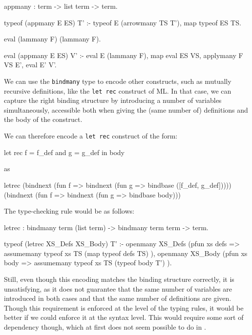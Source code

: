 \documentclass[format=acmlarge,review,anonymous]{acmart}\settopmatter{printfolios=true}
\begin{document}
\begin{codequote}
appmany : term -> list term -> term.

typeof (appmany E ES) T' :-
  typeof E (arrowmany TS T'),
  map typeof ES TS.

eval (lammany F) (lammany F).

eval (appmany E ES) V' :-
  eval E (lammany F),
  map eval ES VS,
  applymany F VS E',
  eval E' V'.
\end{codequote}

We can use the \texttt{bindmany} type to encode other constructs, such
as mutually recursive definitions, like the \texttt{let rec} construct
of ML. In that case, we can capture the right binding structure by
introducing a number of variables simultaneously, accessible both when
giving the (same number of) definitions and the body of the construct.

We can therefore encode a \texttt{let rec} construct of the form:

\begin{codequote}
let rec f = f_def and g = g_def in body
\end{codequote}

as

\begin{codequote}
letrec (bindnext (fun f => bindnext (fun g => bindbase ([f_def, g_def]))))
       (bindnext (fun f => bindnext (fun g => bindbase body)))
\end{codequote}

The type-checking rule would be as follows:

\begin{codequote}
letrec : bindmany term (list term) -> bindmany term term -> term.

typeof (letrec XS_Defs XS_Body) T' :-
  openmany XS_Defs (pfun xs defs =>
    assumemany typeof xs TS (map typeof defs TS)
  ),
  openmany XS_Body (pfun xs body =>
    assumemany typeof xs TS (typeof body T')
  ).
\end{codequote}

Still, even though this encoding matches the binding structure correctly, it is unsatisfying, as it
does not guarantee that the same number of variables are introduced in both cases and that the same
number of definitions are given. Though this requirement is enforced at the level of the typing
rules, it would be better if we could enforce it at the syntax level. This would require some sort
of dependency though, which at first does not seem possible to do in \lamprolog.
\end{document}
